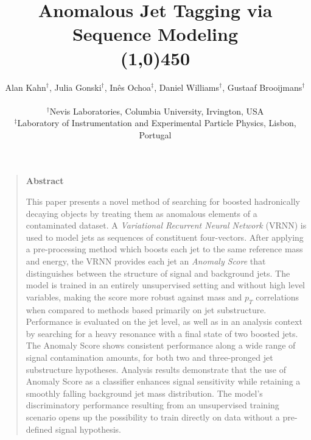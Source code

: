 \documentclass[12pt, a4paper]{article}
\title{\bf{Anomalous Jet Tagging via Sequence Modeling}\\\line(1,0){450}}
\author
{Alan Kahn$^{\dagger}$, Julia Gonski$^{\dagger}$, In\^{e}s Ochoa$^{\ddagger}$, Daniel Williams$^{\dagger}$, Gustaaf Brooijmans$^{\dagger}$\\
\\
\normalsize{$^{\dagger}$Nevis Laboratories, Columbia University, Irvington, USA}\\
\normalsize{$^{\ddagger}$Laboratory of Instrumentation and Experimental Particle Physics, Lisbon, Portugal}
}
\date{}
\newenvironment{sciabstract}{%
\begin{quote}}
{\end{quote}}
\begin{document}
 



\baselineskip16pt

\maketitle 

\setlength{\abovedisplayskip}{5pt}
\setlength{\belowdisplayskip}{5pt}
\setlength{\abovedisplayshortskip}{0pt}
\setlength{\belowdisplayshortskip}{0pt}



\begin{sciabstract}
  \begin{center}
  {\large\bf{Abstract}\\}
  \end{center}
  
  \vspace{0.4cm}

This paper presents a novel method of searching for boosted hadronically
  decaying objects by treating them as anomalous elements of
  a contaminated dataset.  
 A \textit{Variational Recurrent Neural Network} (VRNN) is used to model jets as sequences of constituent four-vectors. 
After applying a pre-processing method which boosts each jet to the same reference mass and energy, the VRNN provides each jet an \textit{Anomaly Score} that distinguishes between the structure of signal and background jets.
The model is trained in an entirely unsupervised setting and without high level variables, making the score more robust against mass and $p_{T}$ correlations when compared to methods based primarily on jet substructure. 
Performance is evaluated on the jet level, as well as in an analysis context by searching for a heavy resonance with a final state of two boosted jets. 
The Anomaly Score shows consistent performance along a wide range of signal contamination amounts, for both two and three-pronged jet substructure hypotheses. 
Analysis results demonstrate that the use of Anomaly Score as a classifier enhances signal sensitivity while retaining a smoothly falling background jet mass distribution. 
The model's discriminatory performance resulting from an unsupervised training scenario opens up the possibility to train directly on data without a pre-defined signal hypothesis.

    
  
\end{sciabstract}
\end{document}
